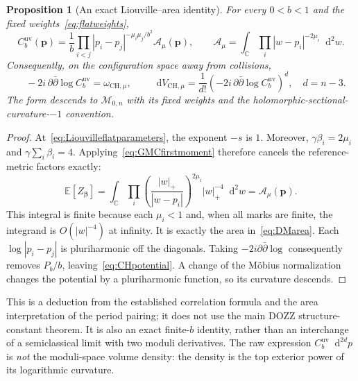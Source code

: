 \documentclass[11pt,a4paper]{article}
\numberwithin{equation}{section}
\newtheorem{proposition}[theorem]{Proposition}
\theoremstyle{definition}
\theoremstyle{remark}
\newcommand{\dd}{\mathop{}\!\mathrm d}
\newcommand{\M}{\mathcal M}
\newcommand{\CC}{\mathbb C}
\begin{document}
\begin{proposition}[An exact Liouville--area identity]
For every $0<b<1$ and the fixed weights~\eqref{eq:flatweights},
\begin{equation}
 \boxed{\quad
 C_b^{\mathrm{uv}}(\boldsymbol p)
   =\frac1b\prod_{i<j}|p_i-p_j|^{-\mu_i\mu_j/b^2}
       \mathcal A_\mu(\boldsymbol p),\qquad
 \mathcal A_\mu=\int_{\CC}\prod_i|w-p_i|^{-2\mu_i}\dd^2w.
 \quad}
 \label{eq:exactLiouvilleDM}
\end{equation}
Consequently, on the configuration space away from collisions,
\begin{equation}
 \boxed{\quad
 -2i\,\partial\bar\partial\log C_b^{\mathrm{uv}}
       =\omega_{\mathrm{CH},\mu},\qquad
 \dd V_{\mathrm{CH},\mu}
       =\frac1{d!}\left(-2i\,\partial\bar\partial
                            \log C_b^{\mathrm{uv}}\right)^d,
 \quad d=n-3.}
 \label{eq:exactLiouvillecurvature}
\end{equation}
The form descends to $\M_{0,n}$ with its fixed weights and the
holomorphic-sectional-curvature-$-1$ convention.
\end{proposition}

\begin{proof}
At~\eqref{eq:Liouvilleflatparameters}, the exponent $-s$ is $1$.
Moreover, $\gamma\beta_i=2\mu_i$ and
$\gamma\sum_i\beta_i=4$. Applying~\eqref{eq:GMCfirstmoment}
therefore cancels the reference-metric factors exactly:
\[
 \mathbb E[Z_{\boldsymbol\beta}]
 =\int_{\CC}
    \prod_i\left(\frac{|w|_+}{|w-p_i|}\right)^{2\mu_i}
    |w|_+^{-4}\dd^2w
 =\mathcal A_\mu(\boldsymbol p).
\]
This integral is finite because each $\mu_i<1$ and, when all
marks are finite, the integrand is $O(|w|^{-4})$ at infinity.
It is exactly the area in~\eqref{eq:DMarea}.
Each $\log|p_i-p_j|$ is pluriharmonic off the diagonals.
Taking $-2i\partial\bar\partial\log$ consequently removes
$P_b/b$, leaving~\eqref{eq:CHpotential}. A change of the
M\"obius normalization changes the potential by a pluriharmonic
function, so its curvature descends.
\end{proof}

This is a deduction from the established correlation formula and
the area interpretation of the period pairing; it does not use
the main DOZZ structure-constant theorem. It is also an exact
finite-$b$ identity, rather than an interchange of a semiclassical
limit with two moduli derivatives. The raw expression
$C_b^{\mathrm{uv}}\dd^{2d}p$ is \emph{not} the moduli-space
volume density: the density is the top exterior power of its
logarithmic curvature.
\end{document}
